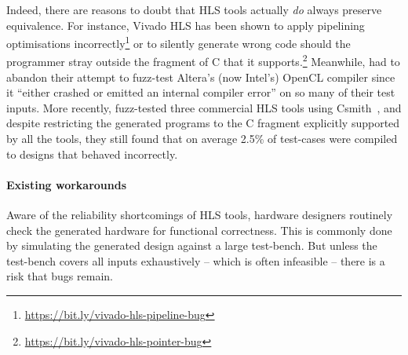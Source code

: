 Indeed, there are reasons to doubt that HLS tools actually \emph{do} always preserve equivalence.
For instance, Vivado HLS has been shown to apply pipelining optimisations incorrectly\footnote{\url{https://bit.ly/vivado-hls-pipeline-bug}} or to silently generate wrong code should the programmer stray outside the fragment of C that it supports.\footnote{\url{https://bit.ly/vivado-hls-pointer-bug}}
Meanwhile, \textcite{lidbury15_many_core_compil_fuzzin} had to abandon their attempt to fuzz-test Altera's (now Intel's) OpenCL compiler since it ``either crashed or emitted an internal compiler error'' on so many of their test inputs.
More recently, \textcite{herklotz21_empir_study_reliab_high_level_synth_tools} fuzz-tested three commercial HLS tools using Csmith~\cite{yang11_findin_under_bugs_c_compil}, and despite restricting the generated programs to the C fragment explicitly supported by all the tools, they still found that on average 2.5\% of test-cases were compiled to designs that behaved incorrectly. %

\paragraph{Existing workarounds}

Aware of the reliability shortcomings of HLS tools, hardware designers routinely check the generated hardware for functional correctness. This is commonly done by simulating the generated design against a large test-bench. But unless the test-bench covers all inputs exhaustively -- which is often infeasible -- there is a risk that bugs remain.

